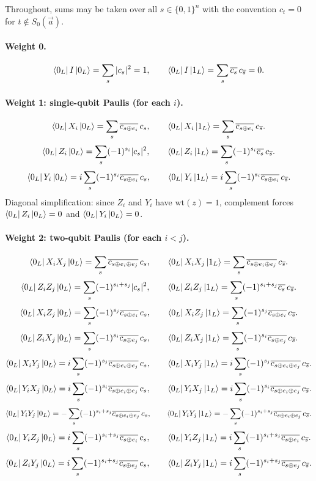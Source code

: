 \documentclass[11pt]{article}
\begin{document}
Throughout, sums may be taken over all \(s\in\{0,1\}^n\) with the convention \(c_t=0\) for \(t\notin S_0(\vec a)\).

\paragraph{Weight 0.}
\[
\bra{0_L}I\ket{0_L}=\sum_s |c_s|^2=1,
\qquad
\bra{0_L}I\ket{1_L}=\sum_s \overline{c_s}\,c_{\overline{s}}=0.
\]

\paragraph{Weight 1: single-qubit Paulis (for each \(i\)).}
\[
\bra{0_L}X_i\ket{0_L}=\sum_s \overline{c_{s\oplus e_i}}\,c_s,
\qquad
\bra{0_L}X_i\ket{1_L}=\sum_s \overline{c_{s\oplus e_i}}\,c_{\overline{s}}.
\]
\[
\bra{0_L}Z_i\ket{0_L}=\sum_s (-1)^{s_i}|c_s|^2,
\qquad
\bra{0_L}Z_i\ket{1_L}=\sum_s (-1)^{s_i}\overline{c_s}\,c_{\overline{s}}.
\]
\[
\bra{0_L}Y_i\ket{0_L}= i\sum_s (-1)^{s_i}\overline{c_{s\oplus e_i}}\,c_s,
\qquad
\bra{0_L}Y_i\ket{1_L}= i\sum_s (-1)^{s_i}\overline{c_{s\oplus e_i}}\,c_{\overline{s}}.
\]
Diagonal simplification: since \(Z_i\) and \(Y_i\) have \(\mathrm{wt}(z)=1\), complement forces
\(\bra{0_L}Z_i\ket{0_L}=0\) and \(\bra{0_L}Y_i\ket{0_L}=0\).

\paragraph{Weight 2: two-qubit Paulis (for each \(i<j\)).}
\[
\bra{0_L}X_iX_j\ket{0_L}=\sum_s \overline{c_{s\oplus e_i\oplus e_j}}\,c_s,
\qquad
\bra{0_L}X_iX_j\ket{1_L}=\sum_s \overline{c_{s\oplus e_i\oplus e_j}}\,c_{\overline{s}}.
\]
\[
\bra{0_L}Z_iZ_j\ket{0_L}=\sum_s (-1)^{s_i+s_j}|c_s|^2,
\qquad
\bra{0_L}Z_iZ_j\ket{1_L}=\sum_s (-1)^{s_i+s_j}\overline{c_s}\,c_{\overline{s}}.
\]
\[
\bra{0_L}X_iZ_j\ket{0_L}=\sum_s (-1)^{s_j}\overline{c_{s\oplus e_i}}\,c_s,
\qquad
\bra{0_L}X_iZ_j\ket{1_L}=\sum_s (-1)^{s_j}\overline{c_{s\oplus e_i}}\,c_{\overline{s}}.
\]
\[
\bra{0_L}Z_iX_j\ket{0_L}=\sum_s (-1)^{s_i}\overline{c_{s\oplus e_j}}\,c_s,
\qquad
\bra{0_L}Z_iX_j\ket{1_L}=\sum_s (-1)^{s_i}\overline{c_{s\oplus e_j}}\,c_{\overline{s}}.
\]
\[
\bra{0_L}X_iY_j\ket{0_L}= i\sum_s (-1)^{s_j}\overline{c_{s\oplus e_i\oplus e_j}}\,c_s,
\qquad
\bra{0_L}X_iY_j\ket{1_L}= i\sum_s (-1)^{s_j}\overline{c_{s\oplus e_i\oplus e_j}}\,c_{\overline{s}}.
\]
\[
\bra{0_L}Y_iX_j\ket{0_L}= i\sum_s (-1)^{s_i}\overline{c_{s\oplus e_i\oplus e_j}}\,c_s,
\qquad
\bra{0_L}Y_iX_j\ket{1_L}= i\sum_s (-1)^{s_i}\overline{c_{s\oplus e_i\oplus e_j}}\,c_{\overline{s}}.
\]
\[
\bra{0_L}Y_iY_j\ket{0_L}= -\sum_s (-1)^{s_i+s_j}\overline{c_{s\oplus e_i\oplus e_j}}\,c_s,
\qquad
\bra{0_L}Y_iY_j\ket{1_L}= -\sum_s (-1)^{s_i+s_j}\overline{c_{s\oplus e_i\oplus e_j}}\,c_{\overline{s}}.
\]
\[
\bra{0_L}Y_iZ_j\ket{0_L}= i\sum_s (-1)^{s_i+s_j}\overline{c_{s\oplus e_i}}\,c_s,
\qquad
\bra{0_L}Y_iZ_j\ket{1_L}= i\sum_s (-1)^{s_i+s_j}\overline{c_{s\oplus e_i}}\,c_{\overline{s}}.
\]
\[
\bra{0_L}Z_iY_j\ket{0_L}= i\sum_s (-1)^{s_i+s_j}\overline{c_{s\oplus e_j}}\,c_s,
\qquad
\bra{0_L}Z_iY_j\ket{1_L}= i\sum_s (-1)^{s_i+s_j}\overline{c_{s\oplus e_j}}\,c_{\overline{s}}.
\]
\end{document}
